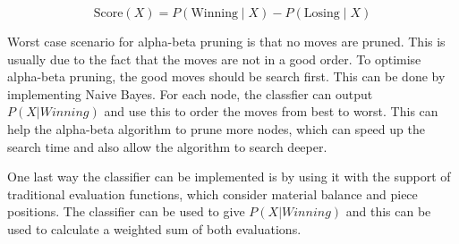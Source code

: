\begin{equation}
    \label{eq:best_move}
    \text{Score}(X) = P(\text{Winning} \mid X) - P(\text{Losing} \mid X)
\end{equation}

Worst case scenario for alpha-beta pruning is that no moves are pruned. This is usually due to the fact that the moves are not in a good order. To optimise alpha-beta pruning, the good moves should be search first. This can be done by implementing Naive Bayes. For each node, the classfier can output $P(X | Winning)$ and use this to order the moves from best to worst. This can help the alpha-beta algorithm to prune more nodes, which can speed up the search time and also allow the algorithm to search deeper.

One last way the classifier can be implemented is by using it with the support of traditional evaluation functions, which consider material balance and piece positions. The classifier can be used to give $P(X | Winning)$ and this can be used to calculate a weighted sum of both evaluations.